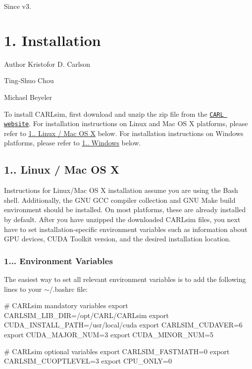 \begin{DoxySince}{Since}
v3.
\end{DoxySince}
\hypertarget{ch1_getting_started_ch1s2_installation}{}\section{1. Installation}\label{ch1_getting_started_ch1s2_installation}
\begin{DoxyAuthor}{Author}
Kristofor D. Carlson 

Ting-\/\+Shuo Chou 

Michael Beyeler
\end{DoxyAuthor}
To install C\+A\+R\+Lsim, first download and unzip the zip file from the \href{http://www.socsci.uci.edu/~jkrichma/CARLsim/index.html}{\tt C\+A\+RL website}. For installation instructions on Linux and Mac OS X platforms, please refer to \hyperlink{ch1_getting_started_ch1s2s1_linux}{1.. Linux / Mac OS X} below. For installation instructions on Windows platforms, please refer to \hyperlink{ch1_getting_started_ch1s2s2_windows}{1.. Windows} below.\hypertarget{ch1_getting_started_ch1s2s1_linux}{}\subsection{1.. Linux / Mac O\+S X}\label{ch1_getting_started_ch1s2s1_linux}
Instructions for Linux/\+Mac OS X installation assume you are using the Bash shell. Additionally, the G\+NU G\+CC compiler collection and G\+NU Make build environment should be installed. On most platforms, these are already installed by default. After you have unzipped the downloaded C\+A\+R\+Lsim files, you next have to set installation-\/specific environment variables such as information about G\+PU devices, C\+U\+DA Toolkit version, and the desired installation location.\hypertarget{ch1_getting_started_ch1s2s1s1_environment_variables}{}\subsubsection{1... Environment Variables}\label{ch1_getting_started_ch1s2s1s1_environment_variables}
The easiest way to set all relevant environment variables is to add the following lines to your {\ttfamily $\sim$/.bashrc} file\+: 
\begin{DoxyCode}
\textcolor{preprocessor}{# CARLsim mandatory variables}
export CARLSIM\_LIB\_DIR=/opt/CARL/CARLsim
export CUDA\_INSTALL\_PATH=/usr/local/cuda
export CARLSIM\_CUDAVER=6
export CUDA\_MAJOR\_NUM=3
export CUDA\_MINOR\_NUM=5

\textcolor{preprocessor}{# CARLsim optional variables}
export CARLSIM\_FASTMATH=0
export CARLSIM\_CUOPTLEVEL=3
export CPU\_ONLY=0
\end{DoxyCode}


